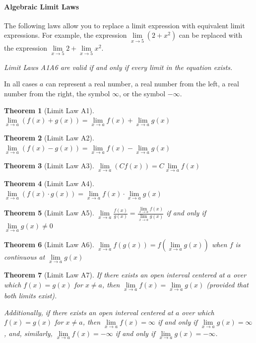 \documentclass[12pt,]{book}
\theoremstyle{plain}
\newtheorem{theorem}{Theorem}[section]
\theoremstyle{definition}
\numberwithin{equation}{section}
\newcommand{\fe}[2]{#1\mathopen{}\left(#2\right)\mathclose{}}
\begin{document}
\paragraph[Algebraic Limit Laws]{Algebraic Limit Laws}\label{paragraphs-76}
The following laws allow you to replace a limit expression with equivalent limit expressions. For example, the expression \(\lim\limits_{x\to5}\left(2+x^2\right)\) can be replaced with the expression \(\lim\limits_{x\to5}2+\lim\limits_{x\to5}x^2\).%
\par
\emph{Limit Laws A1\textendash{}A6 are valid if and only if every limit in the equation exists.}%
\par
In all cases \(a\) can represent a real number, a real number from the left, a real number from the right, the symbol \(\infty\), or the symbol \(-\infty\).%
\begin{theorem}[Limit Law A1]\label{lla1}
\(\lim\limits_{x\to a}\left(\fe{f}{x}+\fe{g}{x}\right)=\lim\limits_{x\to a}\fe{f}{x}+\lim\limits_{x\to a}\fe{g}{x}\)%
\end{theorem}
\begin{theorem}[Limit Law A2]\label{lla2}
\(\lim\limits_{x\to a}\left(\fe{f}{x}-\fe{g}{x}\right)=\lim\limits_{x\to a}\fe{f}{x}-\lim\limits_{x\to a}\fe{g}{x}\)%
\end{theorem}
\begin{theorem}[Limit Law A3]\label{lla3}
\(\lim\limits_{x\to a}\left(C\fe{f}{x}\right)=C\lim\limits_{x\to a}\fe{f}{x}\)%
\end{theorem}
\begin{theorem}[Limit Law A4]\label{lla4}
\(\lim\limits_{x\to a}\left(\fe{f}{x}\cdot\fe{g}{x}\right)=\lim\limits_{x\to a}\fe{f}{x}\cdot\lim\limits_{x\to a}\fe{g}{x}\)%
\end{theorem}
\begin{theorem}[Limit Law A5]\label{lla5}
\(\lim\limits_{x\to a}\frac{\fe{f}{x}}{\fe{g}{x}}=\frac{\lim\limits_{x\to a}\fe{f}{x}}{\lim\limits_{x\to a}\fe{g}{x}}\) if and only if \(\lim\limits_{x\to a}\fe{g}{x}\neq0\)%
\end{theorem}
\begin{theorem}[Limit Law A6]\label{lla6}
\(\lim\limits_{x\to a}\fe{f}{\fe{g}{x}}=\fe{f}{\lim\limits_{x\to a}\fe{g}{x}}\) when \(f\) is continuous at \(\lim\limits_{x\to a}\fe{g}{x}\)%
\end{theorem}
\begin{theorem}[Limit Law A7]\label{lla7}
If there exists an open interval centered at \(a\) over which \(\fe{f}{x}=\fe{g}{x}\) for \(x\neq a\), then \(\lim\limits_{x\to a}\fe{f}{x}=\lim\limits_{x\to a}\fe{g}{x}\) (provided that both limits exist).%
\par
Additionally, if there exists an open interval centered at \(a\) over which \(\fe{f}{x}=\fe{g}{x}\) for \(x\neq a\), then \(\lim\limits_{x\to a}\fe{f}{x}=\infty\) if and only if \(\lim\limits_{x\to a}\fe{g}{x}=\infty\), and, similarly, \(\lim\limits_{x\to a}\fe{f}{x}=-\infty\) if and only if \(\lim\limits_{x\to a}\fe{g}{x}=-\infty\).%
\end{theorem}
\typeout{************************************************}
\typeout{************************************************}
\end{document}
